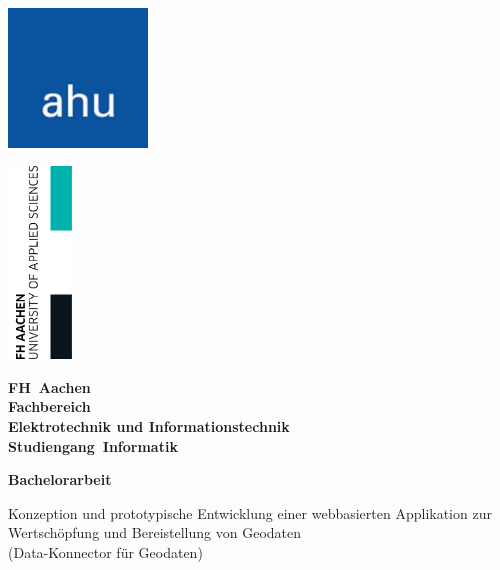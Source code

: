 \documentclass[a4paper,12pt]{scrreprt}
\begin{document}
\begin{titlepage}
	\thispagestyle{empty}

    \noindent
    \begin{minipage}[t]{0.5\textwidth}
        \includegraphics[width=3.7cm]{firmenlogo.jpg}
    \end{minipage}%
    \begin{minipage}[t]{0.5\textwidth}
          \raggedleft
          \includegraphics[width=1.7cm]{FHAC.jpg}
    \end{minipage}

	\vspace{1.0cm}

	{\centering \bfseries \Large FH~Aachen \\
	\vspace{1cm}
	\normalsize Fachbereich\\
	Elektrotechnik und Informationstechnik \\
	Studiengang~Informatik \par}

	\vspace{1cm}
    
	{\centering \bfseries \large Bachelorarbeit \par}

	\vspace{1cm}

	\centering \begin{minipage}[t]{13cm}
		\centering \small Konzeption und prototypische Entwicklung einer webbasierten Applikation zur Wertschöpfung und Bereistellung von Geodaten \\
        (Data-Konnector für Geodaten)
		\medskip
	\end{minipage}


\end{titlepage}
\end{document}
